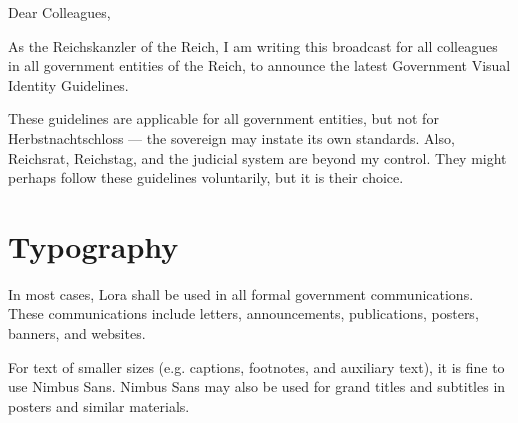 
\usepackage{lipsum}

\newlength{\tmpdima}

\renewcommand{\letterheadgoventity}{Nummer 8}

\newcommand{\examplebox}[2]{
    \begin{center}%
        \fboxsep=1.5em
        \fbox{%
            \begin{minipage}{\textwidth-4em-3em}%
                #2%
            \end{minipage}%
        }\par
        \footnotesize\sffamily#1
    \end{center}\par
}




\noindent
Dear Colleagues,

As the Reichskanzler of the Reich, I am writing this broadcast for all colleagues
in all government entities of the Reich, to announce the latest
Government Visual Identity Guidelines.

These guidelines are applicable for all government entities,
but not for Herbstnachtschloss --- the sovereign may instate its own standards.
Also, Reichsrat, Reichstag, and the judicial system are beyond my control.
They might perhaps follow these guidelines voluntarily, but it is their choice.


\section{Typography}

In most cases, Lora shall be used in all formal government communications.
These communications include letters, announcements, publications, posters, banners, and websites.

For text of smaller sizes (e.g. captions, footnotes, and auxiliary text), it is fine to use Nimbus Sans.
Nimbus Sans may also be used for grand titles and subtitles in posters and similar materials.

